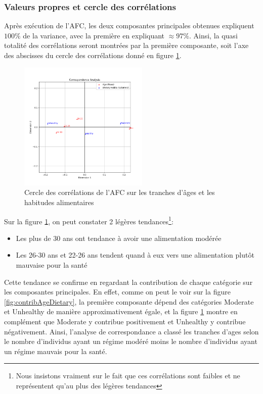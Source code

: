 \subsubsection{Valeurs propres et cercle des corrélations}

Après exécution de l'AFC, les deux composantes principales obtenues expliquent $100\%$ de la variance, avec la première en expliquant $\approx 97\%$.
Ainsi, la quasi totalité des corrélations seront montrées par la première composante, soit l'axe des abscisses du cercle des corrélations donné en figure \ref{fig:corrAgeDietary}.

\begin{figure}[!h]
  \begin{center}
    \includegraphics[width=0.55\textwidth]{Images/Age_Dietary_all/Corr_circle.png}
  \end{center}
  \caption{Cercle des corrélations de l'AFC sur les tranches d'âges et les habitudes alimentaires}
  \label{fig:corrAgeDietary}
\end{figure}

Sur la figure \ref{fig:corrAgeDietary}, on peut constater 2 légères tendances\footnote{Nous insistons vraiment sur le fait que ces corrélations sont faibles et ne représentent qu'au plus des légères tendances}:
\begin{itemize}
  \item Les plus de 30 ans ont tendance à avoir une alimentation modérée 
  \item Les 26-30 ans et 22-26 ans tendent quand à eux vers une alimentation plutôt mauvaise pour la santé
\end{itemize}

Cette tendance se confirme en regardant la contribution de chaque catégorie sur les composantes principales.
En effet, comme on peut le voir sur la figure \ref{fig:contribAgeDietary}, la première composante dépend des catégories Moderate et Unhealthy de manière approximativement égale, et la figure \ref{fig:corrAgeDietary} montre en complément que Moderate y contribue positivement et Unhealthy y contribue négativement. 
Ainsi, l'analyse de correspondance a classé les tranches d'ages selon le nombre d'individus ayant un régime modéré moins le nombre d'individus ayant un régime mauvais pour la santé. 

